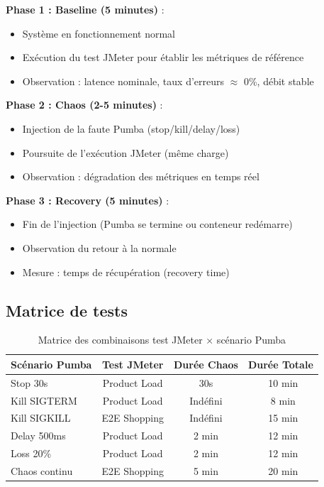 \textbf{Phase 1 : Baseline (5 minutes)} :
\begin{itemize}
    \item Système en fonctionnement normal
    \item Exécution du test JMeter pour établir les métriques de référence
    \item Observation : latence nominale, taux d'erreurs $\approx$ 0\%, débit stable
\end{itemize}

\textbf{Phase 2 : Chaos (2-5 minutes)} :
\begin{itemize}
    \item Injection de la faute Pumba (stop/kill/delay/loss)
    \item Poursuite de l'exécution JMeter (même charge)
    \item Observation : dégradation des métriques en temps réel
\end{itemize}

\textbf{Phase 3 : Recovery (5 minutes)} :
\begin{itemize}
    \item Fin de l'injection (Pumba se termine ou conteneur redémarre)
    \item Observation du retour à la normale
    \item Mesure : temps de récupération (recovery time)
\end{itemize}

\subsection{Matrice de tests}

\begin{table}[H]
\centering
\small
\begin{tabular}{lccc}
\toprule
\textbf{Scénario Pumba} & \textbf{Test JMeter} & \textbf{Durée Chaos} & \textbf{Durée Totale} \\
\midrule
Stop 30s & Product Load & 30s & ~10 min \\
Kill SIGTERM & Product Load & Indéfini & ~8 min \\
Kill SIGKILL & E2E Shopping & Indéfini & ~15 min \\
Delay 500ms & Product Load & 2 min & ~12 min \\
Loss 20\% & Product Load & 2 min & ~12 min \\
Chaos continu & E2E Shopping & 5 min & ~20 min \\
\bottomrule
\end{tabular}
\caption{Matrice des combinaisons test JMeter × scénario Pumba}
\end{table}


